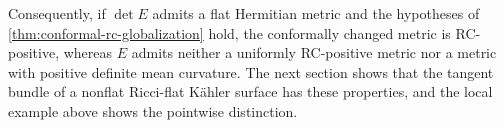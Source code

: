 Consequently, if $\det E$ admits a flat Hermitian metric and the hypotheses of \cref{thm:conformal-rc-globalization} hold, the conformally changed metric is RC-positive, whereas $E$ admits neither a uniformly RC-positive metric nor a metric with positive definite mean curvature. The next section shows that the tangent bundle of a nonflat Ricci-flat K\"ahler surface has these properties, and the local example above shows the pointwise distinction.
